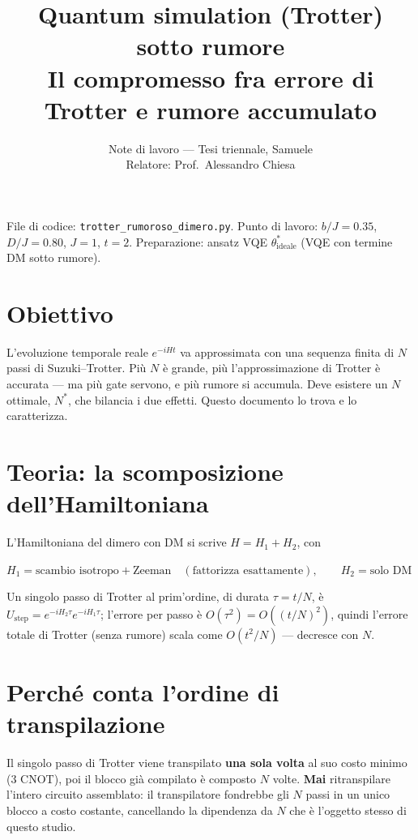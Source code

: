 \documentclass[11pt,a4paper]{article}
\title{\vspace{-1.5em}\color{inkblue}Quantum simulation (Trotter) sotto rumore\\[0.2em]
\Large\normalfont\color{softgray}Il compromesso fra errore di Trotter e rumore accumulato}
\author{Note di lavoro --- Tesi triennale, Samuele\\ Relatore: Prof.\ Alessandro Chiesa}
\date{}
\begin{document}
\sloppy
\maketitle
\thispagestyle{fancy}
\vspace{-2.0em}

File di codice: \texttt{trotter\_rumoroso\_dimero.py}. Punto di lavoro:
$b/J=0.35$, $D/J=0.80$, $J=1$, $t=2$. Preparazione: ansatz VQE
$\theta^*_\text{ideale}$ (VQE con termine DM sotto rumore).

\tableofcontents

\section{Obiettivo}

L'evoluzione temporale reale $e^{-iHt}$ va approssimata con una sequenza
finita di $N$ passi di Suzuki--Trotter. Più $N$ è grande, più
l'approssimazione di Trotter è accurata --- ma più gate servono, e più
rumore si accumula. Deve esistere un $N$ ottimale, $N^*$, che bilancia i
due effetti. Questo documento lo trova e lo caratterizza.

\section{Teoria: la scomposizione dell'Hamiltoniana}

L'Hamiltoniana del dimero con DM si scrive $H=H_1+H_2$, con
\begin{keyeq}
\centering
$H_1 = \text{scambio isotropo} + \text{Zeeman} \quad (\text{fattorizza esattamente}), \qquad
H_2 = \text{solo DM}$
\end{keyeq}
Un singolo passo di Trotter al prim'ordine, di durata $\tau=t/N$, è
$U_\text{step}=e^{-iH_2\tau}e^{-iH_1\tau}$; l'errore per passo è
$O(\tau^2)=O((t/N)^2)$, quindi l'errore totale di Trotter (senza rumore)
scala come $O(t^2/N)$ --- decresce con $N$.

\section{Perché conta l'ordine di transpilazione}

Il singolo passo di Trotter viene transpilato \textbf{una sola volta} al
suo costo minimo (3 CNOT), poi il blocco già compilato è composto $N$
volte. \textbf{Mai} ritranspilare l'intero circuito assemblato: il
transpilatore fondrebbe gli $N$ passi in un unico blocco a costo
costante, cancellando la dipendenza da $N$ che è l'oggetto stesso di
questo studio.
\end{document}
